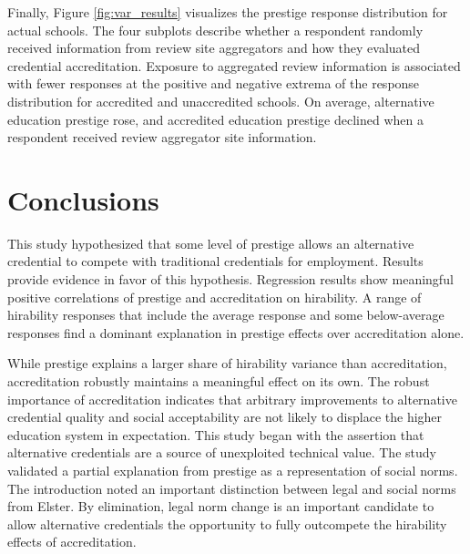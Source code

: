 Finally, Figure \ref{fig:var_results} visualizes the prestige response distribution
for actual schools.
The four subplots describe whether a respondent randomly received information from review site aggregators
and how they evaluated credential accreditation.
Exposure to aggregated review information is associated with fewer responses at the positive
and negative extrema of the response distribution for accredited and unaccredited schools.
On average, alternative education prestige rose,
and accredited education prestige declined when a respondent received review aggregator site information.

\section{Conclusions}

This study hypothesized that some level of prestige allows an alternative credential to compete with traditional credentials for employment.
Results provide evidence in favor of this hypothesis.
Regression results show meaningful positive correlations of prestige and accreditation on hirability.
A range of hirability responses that include the average response and some below-average responses
find a dominant explanation in prestige effects over accreditation alone.

While prestige explains a larger share of hirability variance than accreditation, accreditation robustly maintains a meaningful effect on its own.
The robust importance of accreditation indicates that arbitrary improvements to alternative credential
quality and social acceptability are not likely to displace the higher education system in expectation.
This study began with the assertion that alternative credentials are a source of unexploited technical value.
The study validated a partial explanation from prestige as a representation of social norms.
The introduction noted an important distinction between legal and social norms from Elster.
By elimination, legal norm change is an important candidate to allow alternative credentials the opportunity
to fully outcompete the hirability effects of accreditation.


